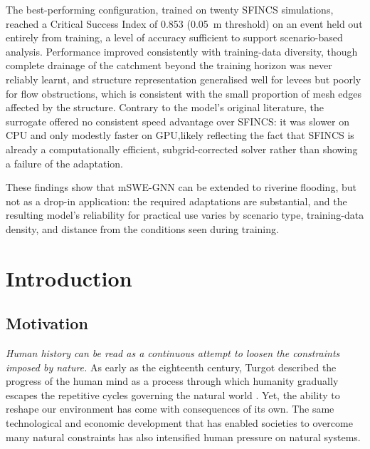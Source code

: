 \documentclass[12pt,a4paper]{report}
\begin{document}
The best-performing configuration, trained on twenty SFINCS simulations, reached a
Critical Success Index of 0.853 (0.05~m threshold) on an event held out entirely from
training, a level of accuracy sufficient to support scenario-based analysis.
Performance improved consistently with training-data diversity, though complete
drainage of the catchment beyond the training horizon was never reliably learnt, and
structure representation generalised well for levees but poorly for flow obstructions, which is consistent with the small proportion of mesh edges affected by the structure. Contrary to
the model's original literature, the surrogate offered no consistent speed advantage
over SFINCS: it was slower on CPU and only modestly faster on GPU,likely reflecting the fact that SFINCS is already a computationally efficient, subgrid-corrected solver rather than showing a
failure of the adaptation.
 
These findings show that mSWE-GNN can be extended to riverine flooding, but not as a
drop-in application: the required adaptations are substantial, and the resulting
model's reliability for practical use varies by scenario type, training-data density,
and distance from the conditions seen during training.

\tableofcontents




\chapter{Introduction}
\label{ch:introduction}
\setcounter{page}{1}


\section{Motivation}
\label{sec:motivation}

\textit{Human history can be read as a continuous attempt to loosen the constraints imposed by nature.} As early as the eighteenth century, Turgot described the progress of the human mind as a process through which humanity gradually escapes the repetitive cycles governing the natural world \citep{turgot1750philosophical}. Yet, the ability to reshape our environment has come with consequences of its own. The same technological and economic development that has enabled societies to overcome many natural constraints has also intensified human pressure on natural systems.
\end{document}
